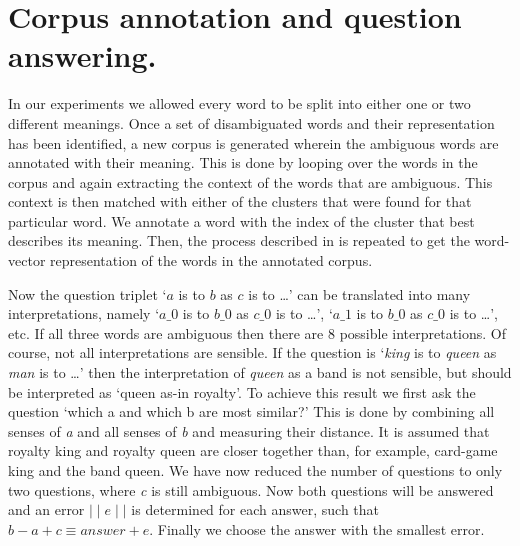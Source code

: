 \documentclass[11pt]{article}
\begin{document}

\section{Corpus annotation and question answering.}
In our experiments we allowed every word to be split into either one or two different meanings.
Once a set of disambiguated words and their representation has been identified, a new corpus is generated wherein the ambiguous words are annotated with their meaning. This is done by looping over the words in the corpus and again extracting the context of the words that are ambiguous. This context is then matched with either of the clusters that were found for that particular word. We annotate a word with the index of the cluster that best describes its meaning. Then, the process described in \cite{Mikolov:13} is repeated to get the word-vector representation of the words in the annotated corpus. 

Now the question triplet `$a$ is to $b$ as $c$ is to \dots' can be translated into many interpretations, namely `$a\_0$ is to $b\_0 $ as $c\_0 $ is to \dots', `$a\_1$ is to $b\_0 $ as $c\_0 $ is to \dots', etc. If all three words are ambiguous then there are 8 possible interpretations. Of course, not all interpretations are sensible. If the question is `\textit{king} is to \textit{queen} as \textit{man} is to \dots' then the interpretation of \textit{queen} as a band is not sensible, but should be interpreted as `queen as-in royalty'. To achieve this result we first ask the question `which a and which b are most similar?' This is done by combining all senses of \textit{a} and all senses of \textit{b} and measuring their distance. It is assumed that royalty king and royalty queen are closer together than, for example, card-game king and the band queen. We have now reduced the number of questions to only two questions, where \textit{c} is still ambiguous. Now both questions will be answered and an error $\mid\mid \textit{e} \mid\mid$ is determined for each answer, such that $\textit{b} - \textit{a} + \textit{c} \equiv \textit{answer} + \textit{e}$. Finally we choose the answer with the smallest error.
\end{document}
